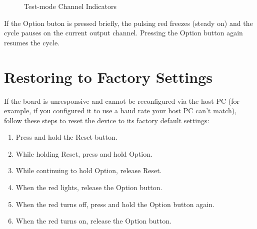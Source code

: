 \documentclass[letterpaper,twoside,onecolumn,openright,final]{memoir}
\begin{document}
\begin{figure}
\begin{center}
  \end{center}
  \caption{Test-mode Channel Indicators\label{fig:testbin}}
\end{figure}

If the Option buton is pressed briefly, the pulsing red  freezes (steady on) and the cycle
pauses on the current output channel.  Pressing the Option button again resumes the cycle.
      
\section{Restoring to Factory Settings}
If the board is unresponsive and cannot be reconfigured via the host PC (for example, if you configured
it to use a baud rate your host PC can't match), follow these steps to reset the device to its 
factory default settings:
\begin{enumerate}
	\item	Press and hold the Reset button.
	\item	While holding Reset, press and hold Option.
	\item	While continuing to hold Option, release Reset.
	\item	When the red  lights, release the Option button.
	\item	When the red  turns off, press and hold the Option button again.
	\item	When the red  turns on, release the Option button.
\end{enumerate}
\end{document}
